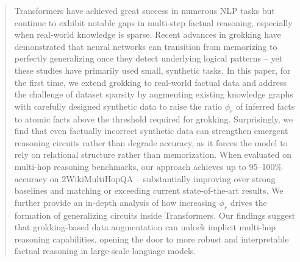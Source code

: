 
\begin{abstract} 
    Transformers have achieved great success in numerous NLP tasks but continue to exhibit notable gaps in multi-step factual reasoning, especially when real-world knowledge is sparse. Recent advances in grokking have demonstrated that neural networks can transition from memorizing to perfectly generalizing once they detect underlying logical patterns -- yet these studies have primarily used small, synthetic tasks. In this paper, for the first time, we extend grokking to real-world factual data and address the challenge of dataset sparsity by augmenting existing knowledge graphs with carefully designed synthetic data to raise the ratio $\phi_r$ of inferred facts to atomic facts above the threshold required for grokking. Surprisingly, we find that even factually incorrect synthetic data can strengthen emergent reasoning circuits rather than degrade accuracy, as it forces the model to rely on relational structure rather than memorization. When evaluated on multi-hop reasoning benchmarks, our approach achieves up to 95--100\% accuracy on 2WikiMultiHopQA -- substantially improving over strong baselines and matching or exceeding current state-of-the-art results. We further provide an in-depth analysis of how increasing $\phi_r$ drives the formation of generalizing circuits inside Transformers. Our findings suggest that grokking-based data augmentation can unlock implicit multi-hop reasoning capabilities, opening the door to more robust and interpretable factual reasoning in large-scale language models.
\end{abstract}
